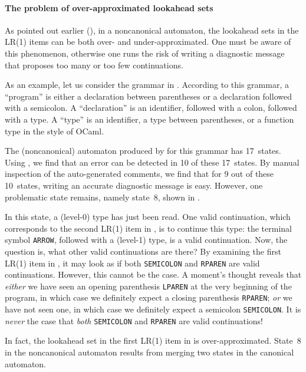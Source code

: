 \documentclass[onecolumn,11pt,nocopyrightspace,preprint]{sigplanconf}
\begin{document}
\paragraph{The problem of over-approximated lookahead sets}

As pointed out earlier (), in a noncanonical
automaton, the lookahead sets in the LR(1) items can be both over- and
under-approximated. One must be aware of this phenomenon, otherwise one runs
the risk of writing a diagnostic message that proposes too many or too few
continuations.

As an example, let us consider the grammar in .
According to this grammar, a ``program'' is either a declaration between
parentheses or a declaration followed with a semicolon. A ``declaration'' is
an identifier, followed with a colon, followed with a type. A ``type'' is an
identifier, a type between parentheses, or a function type in the style of
OCaml.

The (noncanonical) automaton produced by \menhir for this grammar has 17~states.
Using \olisterrors, we find that an error can be detected in 10 of these
17~states. By manual inspection of the auto-generated comments, we find that
for 9 out of these 10~states, writing an accurate diagnostic message is easy. However,
one problematic state remains, namely state~8,
shown in .

In this state, a (level-0) type has just been read. One valid continuation,
which corresponds to the second LR(1) item in ,
is to continue this type: the terminal symbol \verb+ARROW+, followed with a
(level-1) type, is a valid continuation. Now, the question is, what other
valid continuations are there? By examining the first LR(1) item
in , it may look as if both \verb+SEMICOLON+
and \verb+RPAREN+ are valid continuations. However, this cannot be the case. A
moment's thought reveals that \emph{either} we have seen an opening
parenthesis \verb+LPAREN+ at the very beginning of the program, in which case
we definitely expect a closing parenthesis \verb+RPAREN+; \emph{or} we have
not seen one, in which case we definitely expect a semicolon \verb+SEMICOLON+.
It is \emph{never} the case that \emph{both} \verb+SEMICOLON+
and \verb+RPAREN+ are valid continuations!

In fact, the lookahead set in the first LR(1) item
in  is over-approximated.
State~8 in the noncanonical automaton results from merging two states
in the canonical automaton.
\end{document}
